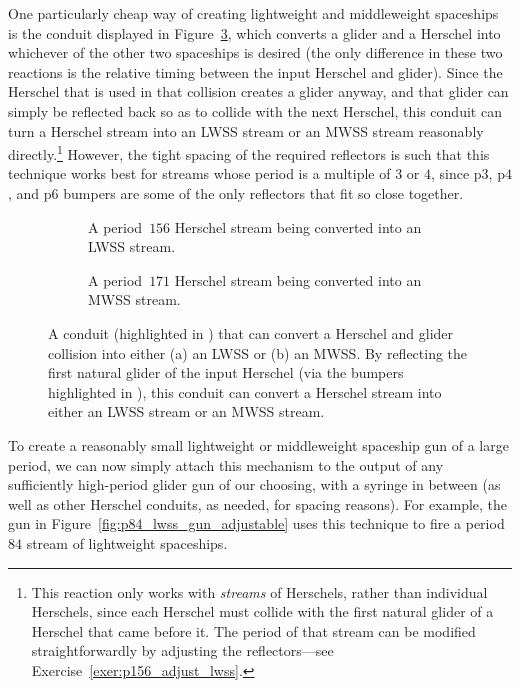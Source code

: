 One particularly cheap way of creating lightweight and middleweight spaceships is the conduit displayed in Figure~\ref{fig:H_plus_G_to_WSS}, which converts a glider and a Herschel into whichever of the other two spaceships is desired (the only difference in these two reactions is the relative timing between the input Herschel and glider). Since the Herschel that is used in that collision creates a glider anyway, and that glider can simply be reflected back so as to collide with the next Herschel, this conduit can turn a Herschel stream into an LWSS stream or an MWSS stream reasonably directly.\footnote{This reaction only works with \emph{streams} of Herschels, rather than individual Herschels, since each Herschel must collide with the first natural glider of a Herschel that came before it. The period of that stream can be modified straightforwardly by adjusting the reflectors---see Exercise~\ref{exer:p156_adjust_lwss}.} However, the tight spacing of the required reflectors is such that this technique works best for streams whose period is a multiple of $3$ or $4$, since p$3$, p$4$, and p$6$ bumpers are some of the only reflectors that fit so close together.

\begin{figure}[!htb]
	\centering
	\begin{subfigure}{0.48\textwidth}
		\centering
		\caption{A period~$156$ Herschel stream being converted into an LWSS stream.}\label{fig:p14_pieces_lwss}
	\end{subfigure} \hfill \begin{subfigure}{0.49\textwidth}
		\centering
		\caption{A period~$171$ Herschel stream being converted into an MWSS stream.}\label{fig:H_G_to_MWSS}
	\end{subfigure}
	\caption{A conduit (highlighted in ) that can convert a Herschel and glider collision into either (a) an LWSS or (b) an MWSS. By reflecting the first natural glider of the input Herschel (via the bumpers highlighted in ), this conduit can convert a Herschel stream into either an LWSS stream or an MWSS stream.}\label{fig:H_plus_G_to_WSS}
\end{figure}

To create a reasonably small lightweight or middleweight spaceship gun of a large period, we can now simply attach this mechanism to the output of any sufficiently high-period glider gun of our choosing, with a syringe in between (as well as other Herschel conduits, as needed, for spacing reasons). For example, the gun in Figure~\ref{fig:p84_lwss_gun_adjustable} uses this technique to fire a period~$84$ stream of lightweight spaceships.

